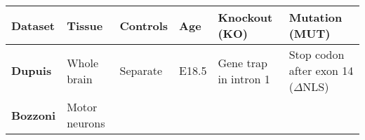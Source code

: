 \begin{longtable}[]{@{}llllll@{}}
	\toprule
	\begin{minipage}[t]{0.14\columnwidth}\raggedright\strut
		{\textbf{Dataset}}\strut
	\end{minipage} & \begin{minipage}[t]{0.14\columnwidth}\raggedright\strut
		{\textbf{Tissue}}\strut
	\end{minipage} & \begin{minipage}[t]{0.12\columnwidth}\raggedright\strut
		{\textbf{Controls}}\strut
	\end{minipage} & \begin{minipage}[t]{0.10\columnwidth}\raggedright\strut
		{\textbf{Age}}\strut
	\end{minipage} & \begin{minipage}[t]{0.14\columnwidth}\raggedright\strut
		{\textbf{Knockout (KO)}}\strut
	\end{minipage} & \begin{minipage}[t]{0.14\columnwidth}\raggedright\strut
		{\textbf{Mutation (MUT)}}\strut
	\end{minipage}\tabularnewline\hline
	\begin{minipage}[t]{0.16\columnwidth}\raggedright\strut
		{\textbf{Dupuis}}
		{\footnotesize\citep{Scekic-zahirovic2016}}\strut
	\end{minipage} & \begin{minipage}[t]{0.14\columnwidth}\raggedright\strut
		{Whole brain}\strut
	\end{minipage} & \begin{minipage}[t]{0.12\columnwidth}\raggedright\strut
		{Separate}\strut
	\end{minipage} & \begin{minipage}[t]{0.10\columnwidth}\raggedright\strut
		{E18.5}\strut
	\end{minipage} & \begin{minipage}[t]{0.16\columnwidth}\raggedright\strut
		{Gene trap in intron 1}\strut
	\end{minipage} & \begin{minipage}[t]{0.16\columnwidth}\raggedright\strut
		{Stop codon after exon 14 ($\Delta$NLS)}\strut
	\end{minipage}\tabularnewline\hline
	\begin{minipage}[t]{0.16\columnwidth}\raggedright\strut
		{\textbf{Bozzoni}}
		{\footnotesize\citep{Capauto2018}}\strut
	\end{minipage} & \begin{minipage}[t]{0.14\columnwidth}\raggedright\strut
		{Motor neurons}
		

\end{minipage}
\end{longtable}
